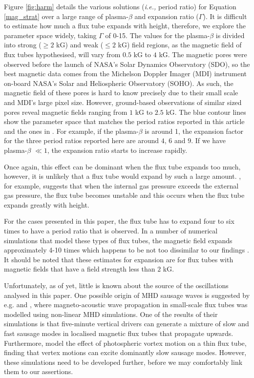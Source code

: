     Figure \ref{fig:harm} details the various solutions (\textit{i.e.,} period ratio) for Equation \ref{mag_strat} over a large range of plasma-$\beta$ and expansion ratio ($\Gamma$).
    It is difficult to estimate how much a flux tube expands with height, therefore, we explore the parameter space widely, taking $\Gamma$ of 0-15.
    The values for the plasma-$\beta$ is divided into strong ($\geq2$ kG) and weak ($\leq2$ kG) field regions, as the magnetic field of flux tubes hypothesised, will vary from $0.5$ kG to $4$ kG.
    The magnetic pores were observed before the launch of NASA's Solar Dynamics Observatory (SDO),
    so the best magnetic data comes from the Michelson Doppler Imager (MDI) instrument on-board NASA's Solar and Heliospheric Observatory (SOHO).
    As such, the magnetic field of these pores is hard to know precisely due to their small scale and MDI's large pixel size.
    However, ground-based observations of similar sized pores reveal magnetic fields ranging from $1$ kG to $2.5$ kG.
    The blue contour lines show the parameter space that matches the period ratios reported in this article and the ones in \citet{Dorotovic2014}.
    For example, if the plasma-$\beta$ is around 1, the expansion factor for the three period ratios reported here are around $4$, $6$ and $9$.
    If we have plasma-$\beta$ $\ll 1$, the expansion ratio starts to increase rapidly. 
    
    Once again, this effect can be dominant when the flux tube expands too much, however, it is unlikely that a flux tube would expand by such a large amount.
    \citet{1982GApFD21237B}, for example, suggests that when the internal gas pressure exceeds the external gas pressure, the flux tube becomes unstable and this occurs when the flux tube expands greatly with height.
    
    For the cases presented in this paper, the flux tube has to expand four to six times to have a period ratio that is observed.
    In a number of numerical simulations that model these types of flux tubes, the magnetic field expands approximately 4-10 times which happens to be not too dissimilar to our findings \citep[see also][]{khomenko,fedun2,fedun1}.
    It should be noted that these estimates for expansion are for flux tubes with magnetic fields that have a field strength less than $2$ kG. 
    
    Unfortunately, as of yet, little is known about the source of the oscillations analysed in this paper.
    One possible origin of MHD sausage waves is suggested by e.g. \citet{khomenko} and \citet{fedun2}, where magneto-acoustic wave propagation in small-scale flux tubes was modelled using non-linear MHD simulations.
    One of the results of their simulations is that five-minute vertical drivers can generate a mixture of slow and fast sausage modes in localised magnetic flux tubes that propagate upwards.
    Furthermore, \citet{fedun1} model the effect of photospheric vortex motion on a thin flux tube, finding that vertex motions can excite dominantly slow sausage modes.
    However, these simulations need to be developed further, before we may comfortably link them to our assertions.

